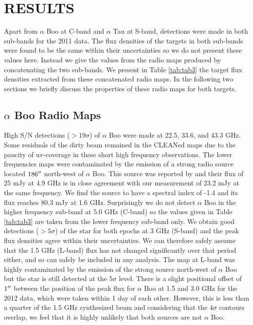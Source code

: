 \documentclass[iop]{emulateapj}
\begin{document}
\section{RESULTS} 

Apart from $\alpha$ Boo at C-band and $\alpha$ Tau at S-band, detections were made in both sub-bands for the 2011 data. The flux densities of the targets in both sub-bands were found to be the same within their uncertainties so we do not present these values here. Instead we give the values from the radio maps produced by concatenating the two sub-bands. We present in Table \ref{tab:tab3} the target flux densities extracted from these concatenated radio maps. In the following two sections we briefly discuss the properties of these radio maps for both targets.

\subsection{$\alpha$ Boo Radio Maps} \label{results1} 
High S/N detections ($>19\sigma$) of $\alpha$ Boo were made at 22.5, 33.6, and 43.3 GHz. Some residuals of the dirty beam remained in the CLEANed maps due to the paucity of uv-coverage in these short high frequency observations. The lower frequencies maps were contaminated by the emission of a strong radio source located $186\mbox{$^{\prime\prime}$}$ north-west of $\alpha$ Boo. This source was reported by \cite{1986AJ.....91..602D} and their flux of 25 mJy at 4.9 GHz is in close agreement with our measurement of 23.2 mJy at the same frequency. We find the source to have a spectral index of -1.4 and its flux reaches  80.3 mJy at 1.6 GHz. Surprisingly we do not detect $\alpha$ Boo in the higher frequency sub-band at 5.0 GHz (C-band) so the values given in Table \ref{tab:tab3} are taken from the lower frequency sub-band only. We obtain good detections ($>5\sigma$) of the star for both epochs at 3 GHz (S-band) and the peak flux densities agree within their uncertainties. We can therefore safely assume that the 1.5 GHz (L-band) flux has not changed significantly over that period either, and so can safely be included in any analysis. The map at L-band was highly contaminated by the emission of the strong source north-west of $\alpha$ Boo but the star is still detected at the $5\sigma$ level. There is a slight positional offset of $1\mbox{$^{\prime\prime}$}$ between the position of the peak flux for $\alpha$ Boo at 1.5 and 3.0 GHz for the 2012 data, which were taken within 1 day of each other. However, this is less than a quarter of the 1.5 GHz synthesized beam and considering that the $4\sigma$ contours overlap, we feel that it is highly unlikely that both sources are not $\alpha$ Boo. 
\end{document}
